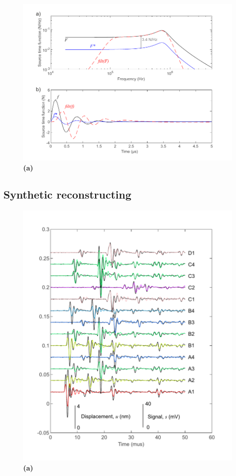 \documentclass[preprint,3p, 11pt,authoryear]{elsarticle}
\begin{document}
{\begin{figure}[ht]
     	\centering
\includegraphics[scale= 1]{FIG9.pdf} 
\caption{\textbf{(a)}  }
	\label{fig9} 
\end{figure}

\subsection{Synthetic reconstructing}

\begin{figure}[ht]
     	\centering
\includegraphics[scale= 1]{FIG10.pdf} 
\caption{\textbf{(a)}  }
	\label{fig10} 
\end{figure}

}
\end{document}
